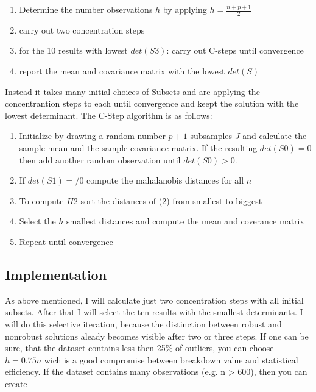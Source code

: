 \begin{enumerate}
    \item Determine the number observations $h$ by applying $h = \frac{n+p+1}{2}$
    \item carry out two concentration steps
    \item for the 10 results with lowest $det(S3)$: carry out C-steps until convergence
    \item report the mean and covariance matrix with the lowest $det(S)$
\end{enumerate}
 
Instead it takes many initial choices of Subsets and are applying the concentrantion steps to each until convergence and keept the solution with the lowest determinant.
The C-Step algorithm is as follows:

\begin{enumerate}
    \item Initialize by drawing a random number $p+1$ subsamples $J$ and calculate the sample mean and the sample covariance matrix. If the resulting $det(S0)=0$ then add another random observation until $det(S0)>0$.
    \item If $det(S1)=/0$ compute the mahalanobis distances for all $n$
    \item To compute $H2$ sort the distances of (2) from smallest to biggest
    \item Select the $h$ smallest distances and compute the mean and coverance matrix
    \item Repeat until convergence
\end{enumerate}
\citep[p.214]{rousseeuw1999fast}


\subsection*{Implementation}
As above mentioned, I will calculate just two concentration steps with all initial subsets.
After that I will select the ten results with the smallest determinants.
I will do this selective iteration, because the distinction between robust and nonrobust solutions aleady becomes visible after two or three steps.  
If one can be sure, that the dataset contains less then 25\% of outliers, you can choose $h=0.75n$ wich is a good compromise between breakdown value and statistical efficiency.
If the dataset contains many observations (e.g. n > 600), then you can create


